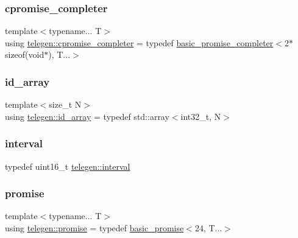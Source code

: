 \mbox{\label{namespacetelegen_a2317bde5362d45695c42b49fcf2ee54f}} 
\subsubsection{\texorpdfstring{cpromise\+\_\+completer}{cpromise\_completer}}
{\footnotesize\ttfamily template$<$typename... T$>$ \\
using \hyperlink{namespacetelegen_a2317bde5362d45695c42b49fcf2ee54f}{telegen\+::cpromise\+\_\+completer} = typedef \hyperlink{classtelegen_1_1basic__promise__completer}{basic\+\_\+promise\+\_\+completer}$<$2$\ast$sizeof(void$\ast$), T...$>$}

\mbox{\label{namespacetelegen_acc765ed2873f0f8fb3fbbe40b04bbf40}} 
\subsubsection{\texorpdfstring{id\+\_\+array}{id\_array}}
{\footnotesize\ttfamily template$<$size\+\_\+t N$>$ \\
using \hyperlink{namespacetelegen_acc765ed2873f0f8fb3fbbe40b04bbf40}{telegen\+::id\+\_\+array} = typedef std\+::array$<$int32\+\_\+t, N$>$}

\mbox{\label{namespacetelegen_ad925de2d0a99bc43918533abf0457344}} 
\subsubsection{\texorpdfstring{interval}{interval}}
{\footnotesize\ttfamily typedef uint16\+\_\+t \hyperlink{namespacetelegen_ad925de2d0a99bc43918533abf0457344}{telegen\+::interval}}

\mbox{\label{namespacetelegen_a9dd802bb5d30cf96b0c616750d43ae86}} 
\subsubsection{\texorpdfstring{promise}{promise}}
{\footnotesize\ttfamily template$<$typename... T$>$ \\
using \hyperlink{namespacetelegen_a9dd802bb5d30cf96b0c616750d43ae86}{telegen\+::promise} = typedef \hyperlink{classtelegen_1_1basic__promise}{basic\+\_\+promise}$<$24, T...$>$}

